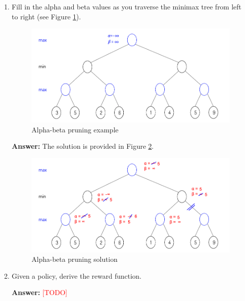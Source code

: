 \documentclass{article}
\newenvironment{QandA}{\begin{enumerate}[label=\arabic*.]}{\end{enumerate}}
\newenvironment{answer}{\par\normalfont \textbf{Answer:}}{}
\newcommand{\todo}{\textcolor{red}{[TODO]}}
\begin{document}
\begin{QandA}
    \item Fill in the alpha and beta values as you traverse the minimax tree from left to right (see Figure \ref{fig:alpha-beta}).
    \begin{figure}[h!]
        \centering
        \includegraphics[width=0.7\columnwidth]{img/alpha-beta.png}
        \caption{Alpha-beta pruning example}
        \label{fig:alpha-beta}
    \end{figure}

    \begin{answer}
        The solution is provided in Figure \ref{fig:alpha-beta-sol}.
    \end{answer}

    \begin{figure}[h!]
        \centering
        \includegraphics[width=0.7\columnwidth]{img/alpha-beta-sol.png}
        \caption{Alpha-beta pruning solution}
        \label{fig:alpha-beta-sol}
    \end{figure}

    \item Given a policy, derive the reward function.
    \begin{answer}
        \todo
    \end{answer}


\end{QandA}
\end{document}
